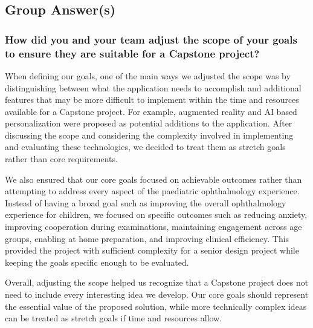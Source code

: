 \documentclass{article}
\begin{document}
\subsection*{Group Answer(s)}

\subsubsection*{How did you and your team adjust the scope of your goals to ensure they are suitable for a Capstone project?}

When defining our goals, one of the main ways we adjusted the scope was by distinguishing between what the application needs to accomplish and additional features that may be 
more difficult to implement within the time and resources available for a Capstone project. For example, augmented reality and AI based personalization were proposed as potential 
additions to the application. After discussing the scope and considering the complexity involved in implementing and evaluating these technologies, we decided to treat them as 
stretch goals rather than core requirements.

We also ensured that our core goals focused on achievable outcomes rather than attempting to address every aspect of the paediatric ophthalmology experience. Instead of having 
a broad goal such as improving the overall ophthalmology experience for children, we focused on specific outcomes such as reducing anxiety, improving cooperation during 
examinations, maintaining engagement across age groups, enabling at home preparation, and improving clinical efficiency. This provided the project with sufficient complexity 
for a senior design project while keeping the goals specific enough to be evaluated.

Overall, adjusting the scope helped us recognize that a Capstone project does not need to include every interesting idea we develop. Our core goals should represent the 
essential value of the proposed solution, while more technically complex ideas can be treated as stretch goals if time and resources allow.



\end{document}
